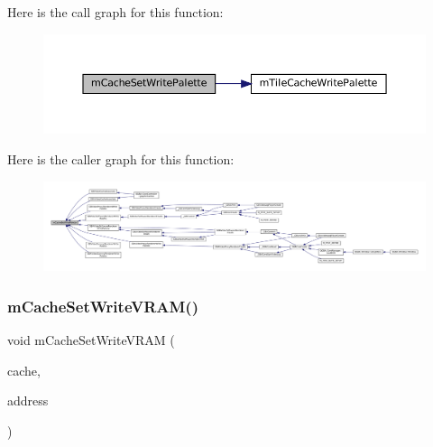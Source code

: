 Here is the call graph for this function\+:
\nopagebreak
\begin{figure}[H]
\begin{center}
\leavevmode
\includegraphics[width=350pt]{core_2cache-set_8c_a911c877cb6f25d98b07830de12a90dd5_cgraph}
\end{center}
\end{figure}
Here is the caller graph for this function\+:
\nopagebreak
\begin{figure}[H]
\begin{center}
\leavevmode
\includegraphics[width=350pt]{core_2cache-set_8c_a911c877cb6f25d98b07830de12a90dd5_icgraph}
\end{center}
\end{figure}
\mbox{\label{core_2cache-set_8c_ab75388da75a72f138ca6e24089fe5158}} 
\subsubsection{\texorpdfstring{m\+Cache\+Set\+Write\+V\+R\+A\+M()}{mCacheSetWriteVRAM()}}
{\footnotesize\ttfamily void m\+Cache\+Set\+Write\+V\+R\+AM (\begin{DoxyParamCaption}\item[{struct m\+Cache\+Set $\ast$}]{cache,  }\item[{uint32\+\_\+t}]{address }\end{DoxyParamCaption})}

